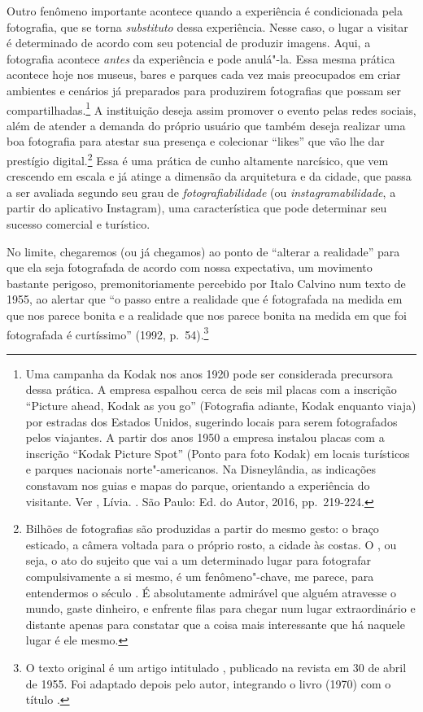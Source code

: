 Outro fenômeno importante acontece quando a experiência é condicionada
pela fotografia, que se torna \emph{substituto} dessa experiência. Nesse
caso, o lugar a visitar é determinado de acordo com seu potencial de
produzir imagens. Aqui, a fotografia acontece \emph{antes} da
experiência e pode anulá"-la. Essa mesma prática acontece hoje nos
museus, bares e parques cada vez mais preocupados em criar ambientes e
cenários já preparados para produzirem fotografias que possam ser
compartilhadas.\footnote{Uma campanha da Kodak nos anos 1920 pode ser
  considerada precursora dessa prática. A empresa espalhou cerca de seis
  mil placas com a inscrição ``Picture ahead, Kodak as you
  go'' (Fotografia adiante, Kodak enquanto viaja) por estradas dos
  Estados Unidos, sugerindo locais para serem fotografados pelos
  viajantes. A partir dos anos 1950 a empresa instalou placas com a
  inscrição ``Kodak Picture Spot'' (Ponto para foto Kodak) em locais
  turísticos e parques nacionais norte"-americanos. Na Disneylândia, as
  indicações constavam nos guias e mapas do parque, orientando a
  experiência do visitante. Ver , Lívia. {}. São Paulo: Ed. do Autor,
  2016, pp.~219-224.} A instituição deseja assim promover o evento pelas
redes sociais, além de atender a demanda do próprio usuário que também
deseja realizar uma boa fotografia para atestar sua presença e
colecionar ``likes'' que vão lhe dar prestígio digital.\footnote{Bilhões de fotografias são produzidas a partir do mesmo gesto: o braço esticado, a câmera voltada para o próprio rosto, a cidade às costas. O {}, ou seja, o ato do sujeito que vai a um determinado lugar para fotografar compulsivamente a si mesmo, é um fenômeno"-chave, me parece, para entendermos o século . É absolutamente admirável que alguém atravesse o mundo, gaste dinheiro, e enfrente filas para chegar num lugar extraordinário e distante apenas para constatar que a coisa mais interessante que há naquele lugar é ele mesmo.}
Essa é uma prática de cunho altamente narcísico, que vem crescendo em escala e já atinge a dimensão da arquitetura e da cidade, que passa a ser avaliada segundo seu grau de \emph{fotografiabilidade} (ou \emph{instagramabilidade},
a partir do aplicativo Instagram), uma
característica que pode determinar seu sucesso comercial e turístico.

No limite, chegaremos (ou já chegamos) ao ponto de ``alterar a
realidade'' para que ela seja fotografada de acordo com nossa
expectativa, um movimento bastante perigoso, premonitoriamente percebido
por Italo Calvino num texto de 1955, ao alertar que ``o passo entre a
realidade que é fotografada na medida em que nos parece bonita e a
realidade que nos parece bonita na medida em que foi fotografada é
curtíssimo'' (1992, p.~54).\footnote{O texto original é um artigo
  intitulado {}, publicado na revista {} em 30 de abril de 1955. Foi adaptado depois pelo autor,
  integrando o livro {} (1970) com o título {}.}


